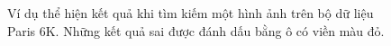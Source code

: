 \begin{figure}[!htbp]
\begin{center}
    \fi
    \caption[Ví dụ thể hiện kết quả khi tìm kiếm một hình ảnh trên bộ dữ liệu Paris 6K]{Ví dụ thể hiện kết quả khi tìm kiếm một hình ảnh trên bộ dữ liệu Paris 6K. Những kết quả sai được đánh dấu bằng ô có viền màu đỏ.}
    \label{FigResultsParis}
  \end{center}
\end{figure}

%


